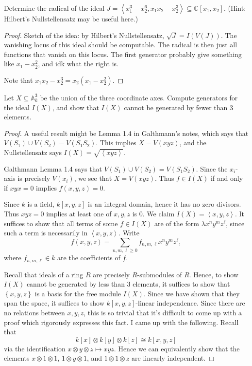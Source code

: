 \documentclass[11pt, letterpaper]{article}
\begin{document}
\begin{problem}
	Determine the radical of the ideal $J=\left\langle x^3_1 - x^6_2, x_1x_2-x_2^3 \right\rangle \subseteq \mathbb{C} [x_1,x_2]$. (Hint: Hilbert's Nullstellensatz may be useful here.)
\end{problem}
\begin{proof}
	Sketch of the idea: by Hilbert's Nullstellensatz, $\sqrt{J} =I(V(J))$. The vanishing locus of this ideal should be computable. The radical is then just all functions that vanish on this locus. The first generator probably give something like $x_1 - x_2^2$, and idk what the right is.



	Note that $x_1x_2 - x_2^3 = x_2(x_1 - x_2^2)$. 
\end{proof}
\begin{problem}
	Let $X\subseteq \mathbb{A} _k^3$ be the union of the three coordinate axes. Compute generators for the ideal $I(X)$, and show that $I(X)$ cannot be generated by fewer than 3 elements.
\end{problem}
\begin{proof}
	A useful result might be Lemma 1.4 in Galthmann's notes, which says that $V(S_1)\cup V(S_2) = V(S_1S_2)$. This implies $X = V(xyz)$, and the Nullstellensatz says $I(X) = \sqrt{\left\langle xyz \right\rangle } $.


	Galthmann Lemma 1.4 says that $V(S_1) \cup V(S_2) = V(S_1S_2)$. Since the $x_i$-axis is precisely $V(x_i)$, we see that $X = V(xyz)$. Thus $f\in I(X)$ if and only if $xyx=0$ implies $f(x,y,z)=0$.

	Since $k$ is a field, $k[x,y,z]$ is an integral domain, hence it has no zero divisors. Thus $xyz=0$ implies at least one of $x,y,z$ is 0. We claim $I(X)=\left\langle x,y,z \right\rangle $. It suffices to show that all terms of some $f\in I(X)$ are of the form $\lambda x^ny^mz^{\ell } $, since such a term is necessarily in $\left\langle x,y,z \right\rangle $. Write
	\[
		f(x,y,z) = \sum_{n,m,\ell \geq 0} f_{n,m,\ell } x^ny^mz^{\ell } ,
	\]
	where $f_{n,m,\ell } \in k$ are the coefficients of $f$.

	Recall that ideals of a ring $R$ are precisely $R$-submodules of $R$. Hence, to show $I(X)$ cannot be generated by less than 3 elements, it suffices to show that $\left\{ x,y,z \right\} $ is a basis for the free module $I(X)$. Since we have shown that they span the space, it suffices to show $k[x,y,z]$-linear independence. Since there are no relations between $x,y,z$, this is so trivial that it's difficult to come up with a proof which rigorously expresses this fact. I came up with the following. Recall that
	\[
		k[x] \otimes k[y] \otimes k[z] \cong k[x,y,z]
	\]
	via the identification $x \otimes y \otimes z\mapsto xyz$. Hence we can equivalently show that the elements $x\otimes 1 \otimes 1$, $1\otimes y\otimes 1$, and $1\otimes 1\otimes z$ are linearly independent.
\end{proof}
\end{document}
